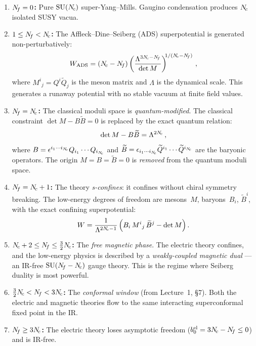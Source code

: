 \documentclass[11pt,a4paper]{article}
\begin{document}
\begin{enumerate}[label=\textbf{\arabic*.},leftmargin=*]
  \item \textbf{$N_{\!f} = 0$:} Pure $\mathrm{SU}(N_{\!c})$ super-Yang--Mills.  Gaugino
    condensation produces $N_{\!c}$ isolated SUSY vacua.

  \item \textbf{$1 \leq N_{\!f} < N_{\!c}$:} The
    Affleck--Dine--Seiberg (ADS) superpotential is generated non-perturbatively:
    \begin{equation}\label{eq:ADS}
      W_{\mathrm{ADS}} = (\Nc - \Nf)
      \left(\frac{\Lambda^{3\Nc - \Nf}}{\det M}\right)^{\!\!1/(\Nc - \Nf)}\,,
    \end{equation}
    where $M^i{}_j = Q^i \widetilde{Q}_j$ is the meson matrix and $\Lambda$
    is the dynamical scale.  This generates a runaway potential with no stable
    vacuum at finite field values.

  \item \textbf{$N_{\!f} = N_{\!c}$:} The classical moduli space is
    \emph{quantum-modified}.  The classical constraint
    $\det M - B\widetilde{B} = 0$ is replaced by the exact quantum relation:
    \begin{equation}\label{eq:quantum-constraint}
      \det M - B\widetilde{B} = \Lambda^{2N_{\!c}}\,,
    \end{equation}
    where $B = \epsilon^{i_1 \cdots i_{N_{\!c}}} Q_{i_1} \cdots Q_{i_{N_{\!c}}}$ and
    $\widetilde{B} = \epsilon_{i_1 \cdots i_{N_{\!c}}} \widetilde{Q}^{i_1} \cdots
    \widetilde{Q}^{i_{N_{\!c}}}$ are the baryonic operators.  The origin $M = B =
    \widetilde{B} = 0$ is \emph{removed} from the quantum moduli space.

  \item \textbf{$N_{\!f} = N_{\!c} + 1$:} The theory \emph{s-confines}: it confines
    without chiral symmetry breaking.  The low-energy degrees of freedom are
    mesons~$M$, baryons~$B_i$, $\widetilde{B}^i$, with the exact confining
    superpotential:
    \begin{equation}\label{eq:s-confinement}
      W = \frac{1}{\Lambda^{2N_{\!c} - 1}}
      \left(B_i\, M^i{}_j\, \widetilde{B}^j - \det M\right).
    \end{equation}

  \item \textbf{$N_{\!c} + 2 \leq N_{\!f} \leq \tfrac{3}{2}N_{\!c}$:}
    The \emph{free magnetic phase}.
    The electric theory confines, and the low-energy physics is described by a
    \emph{weakly-coupled magnetic dual} --- an IR-free $\mathrm{SU}(N_{\!f} - N_{\!c})$ gauge
    theory.  This is the regime where Seiberg duality is most powerful.

  \item \textbf{$\tfrac{3}{2}N_{\!c} < N_{\!f} < 3N_{\!c}$:}
    The \emph{conformal window} (from Lecture~1, \S7).  Both the electric and
    magnetic theories flow to the same interacting superconformal fixed point
    in the IR.

  \item \textbf{$N_{\!f} \geq 3N_{\!c}$:} The electric theory loses asymptotic
    freedom ($b_0^{\text{el}} = 3N_{\!c} - N_{\!f} \leq 0$) and is IR-free.
\end{enumerate}
\end{document}
